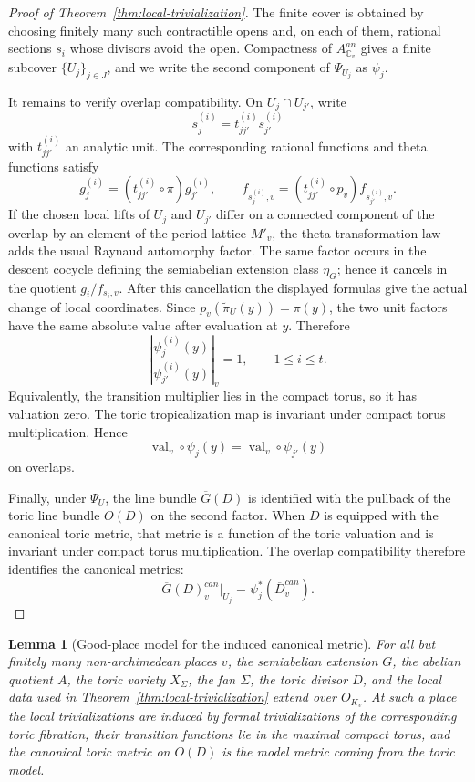 \documentclass[10pt,a4paper]{amsart}
\theoremstyle{plain}
\newtheorem{lemma}[theorem]{Lemma}
\DeclareMathOperator{\val}{val}
\theoremstyle{plain}
\numberwithin{equation}{section}
\begin{document}
\begin{proof}[Proof of Theorem~\ref{thm:local-trivialization}]
	The finite cover is obtained by choosing finitely many such contractible opens
	and, on each of them, rational sections \(s_i\) whose divisors avoid the open.
	Compactness of \(A_{\mathbb C_v}^{an}\) gives a finite subcover
	\(\{U_j\}_{j\in J}\), and we write the second component of \(\Psi_{U_j}\) as
	\(\psi_j\).
	
	It remains to verify overlap compatibility.  On \(U_j\cap U_{j'}\), write
	\[
	s_j^{(i)}=t_{jj'}^{(i)}s_{j'}^{(i)}
	\]
	with \(t_{jj'}^{(i)}\) an analytic unit.  The corresponding rational functions
	and theta functions satisfy
	\[
	g_j^{(i)}=(t_{jj'}^{(i)}\circ\pi)g_{j'}^{(i)},\qquad
	f_{s_j^{(i)},v}=(t_{jj'}^{(i)}\circ p_v)f_{s_{j'}^{(i)},v}.
	\]
	If the chosen local lifts of \(U_j\) and \(U_{j'}\) differ on a connected
	component of the overlap by an element of the period lattice \(M'_v\), the
	theta transformation law adds the usual Raynaud automorphy factor.  The same
	factor occurs in the descent cocycle defining the semiabelian extension
	class \(\eta_G\); hence it cancels in the quotient
	\(g_i/f_{s_i,v}\).  After this cancellation the displayed formulas give the
	actual change of local coordinates.
	Since \(p_v(\widetilde\pi_U(y))=\pi(y)\), the two unit factors have the same
	absolute value after evaluation at \(y\).  Therefore
	\[
	\left|
	\frac{\psi_j^{(i)}(y)}{\psi_{j'}^{(i)}(y)}
	\right|_v=1,\qquad 1\le i\le t.
	\]
	Equivalently, the transition multiplier lies in the compact torus, so it has
	valuation zero.  The toric tropicalization map is invariant under compact
	torus multiplication.  Hence
	\[
	\val_v\circ\psi_j(y)=\val_v\circ\psi_{j'}(y)
	\]
	on overlaps.
	
	Finally, under \(\Psi_U\), the line bundle \(\overline G(D)\) is identified
	with the pullback of the toric line bundle \(O(D)\) on the second factor.  When
	\(D\) is equipped with the canonical toric metric, that metric is a function
	of the toric valuation and is invariant under compact torus multiplication.
	The overlap compatibility therefore identifies the canonical metrics:
	\[
	\overline G(D)^{can}_v|_{U_j}=\psi_j^*(\overline D^{can}_v).
	\]
\end{proof}
\begin{lemma}[Good-place model for the induced canonical metric]\label{input:good-place-model-induced}
	For all but finitely many non-archimedean places \(v\), the semiabelian
	extension \(G\), the abelian quotient \(A\), the toric variety \(X_\Sigma\), the
	fan \(\Sigma\), the toric divisor \(D\), and the local data used in
	Theorem~\ref{thm:local-trivialization} extend over \(O_{K_v}\).  At such a
	place the local trivializations are induced by formal trivializations of the
	corresponding toric fibration, their transition functions lie in the maximal
	compact torus, and the canonical toric metric on \(O(D)\) is the model metric
	coming from the toric model.
\end{lemma}
\end{document}

